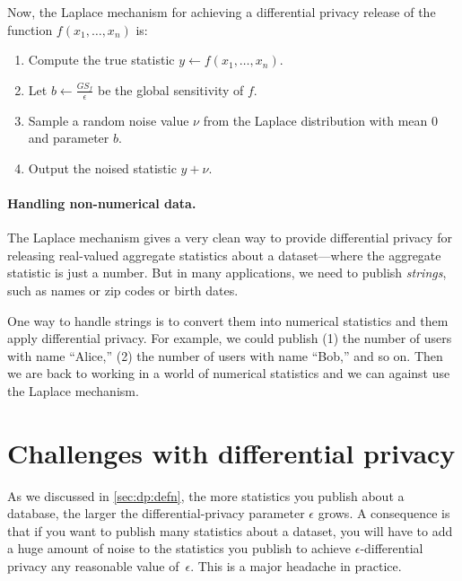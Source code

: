 Now, the Laplace mechanism for achieving a differential privacy release
of the function $f(x_1, \dots, x_n)$ is:
\begin{enumerate}
  \item Compute the true statistic $y \gets f(x_1, \dots, x_n)$.
  \item Let $b \gets \frac{GS_f}{\epsilon}$ be the global sensitivity of $f$.
  \item Sample a random noise value $\nu$ from the Laplace distribution
        with mean $0$ and parameter $b$.
  \item Output the noised statistic $y + \nu$.
\end{enumerate}


\paragraph{Handling non-numerical data.}
The Laplace mechanism gives a very clean way to provide differential
privacy for releasing real-valued aggregate statistics about
a dataset---where the aggregate statistic is just a number.
But in many applications, we need to publish \emph{strings},
such as names or zip codes or birth dates.

One way to handle strings is to convert them into numerical 
statistics and them apply differential privacy.
For example, we could publish (1) the number of users
with name ``Alice,'' (2) the number of users with 
name ``Bob,'' and so on.
Then we are back to working in a world of numerical statistics
and we can against use the Laplace mechanism.

\section{Challenges with differential privacy}

As we discussed in \cref{sec:dp:defn}, the more statistics you publish
about a database, the larger the differential-privacy parameter $\epsilon$ grows.
A consequence is that if you want to publish many statistics about a dataset,
you will have to add a huge amount of noise to the statistics you publish
to achieve $\epsilon$-differential privacy any reasonable value of~$\epsilon$.
This is a major headache in practice.

